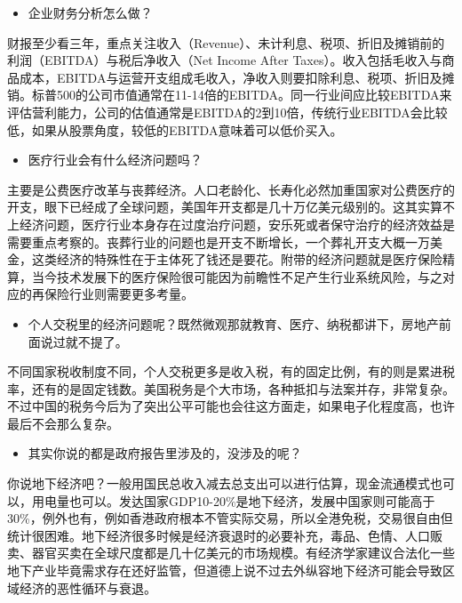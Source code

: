 \documentclass[
  letterpaper,
  DIV=11,
  numbers=noendperiod]{scrreprt}
\providecommand{\tightlist}{%
  \setlength{\itemsep}{0pt}\setlength{\parskip}{0pt}}\usepackage{longtable,booktabs,array}
\begin{document}
\begin{itemize}
\tightlist
\item
  企业财务分析怎么做？
\end{itemize}

财报至少看三年，重点关注收入（Revenue）、未计利息、税项、折旧及摊销前的利润（EBITDA）与税后净收入（Net
Income After
Taxes）。收入包括毛收入与商品成本，EBITDA与运营开支组成毛收入，净收入则要扣除利息、税项、折旧及摊销。标普500的公司市值通常在11-14倍的EBITDA。同一行业间应比较EBITDA来评估营利能力，公司的估值通常是EBITDA的2到10倍，传统行业EBITDA会比较低，如果从股票角度，较低的EBITDA意味着可以低价买入。

\begin{itemize}
\tightlist
\item
  医疗行业会有什么经济问题吗？
\end{itemize}

主要是公费医疗改革与丧葬经济。人口老龄化、长寿化必然加重国家对公费医疗的开支，眼下已经成了全球问题，美国年开支都是几十万亿美元级别的。这其实算不上经济问题，医疗行业本身存在过度治疗问题，安乐死或者保守治疗的经济效益是需要重点考察的。丧葬行业的问题也是开支不断增长，一个葬礼开支大概一万美金，这类经济的特殊性在于主体死了钱还是要花。附带的经济问题就是医疗保险精算，当今技术发展下的医疗保险很可能因为前瞻性不足产生行业系统风险，与之对应的再保险行业则需要更多考量。

\begin{itemize}
\tightlist
\item
  个人交税里的经济问题呢？既然微观那就教育、医疗、纳税都讲下，房地产前面说过就不提了。
\end{itemize}

不同国家税收制度不同，个人交税更多是收入税，有的固定比例，有的则是累进税率，还有的是固定钱数。美国税务是个大市场，各种抵扣与法案并存，非常复杂。不过中国的税务今后为了突出公平可能也会往这方面走，如果电子化程度高，也许最后不会那么复杂。

\begin{itemize}
\tightlist
\item
  其实你说的都是政府报告里涉及的，没涉及的呢？
\end{itemize}

你说地下经济吧？一般用国民总收入减去总支出可以进行估算，现金流通模式也可以，用电量也可以。发达国家GDP10-20\%是地下经济，发展中国家则可能高于30\%，例外也有，例如香港政府根本不管实际交易，所以全港免税，交易很自由但统计很困难。地下经济很多时候是经济衰退时的必要补充，毒品、色情、人口贩卖、器官买卖在全球尺度都是几十亿美元的市场规模。有经济学家建议合法化一些地下产业毕竟需求存在还好监管，但道德上说不过去外纵容地下经济可能会导致区域经济的恶性循环与衰退。
\end{document}
